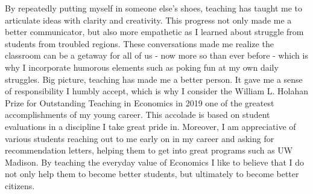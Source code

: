 \documentclass[a4paper,12pt]{article}
\begin{document}
By repeatedly putting myself in someone else’s shoes, teaching has taught me to articulate ideas with clarity and creativity. This progress not only made me a better communicator, but also more empathetic as I learned about struggle from students from troubled regions. These conversations made me realize the classroom can be a getaway for all of us - now more so than ever before - which is why I incorporate humorous elements such as poking fun at my own daily struggles. Big picture, teaching has made me a better person. It gave me a sense of responsibility I humbly accept, which is why I consider the William L. Holahan Prize for Outstanding Teaching in Economics in 2019 one of the greatest accomplishments of my young career. This accolade is based on student evaluations in a discipline I take great pride in. Moreover, I am appreciative of various students reaching out to me early on in my career and asking for recommendation letters, helping them to get into great programs such as UW Madison. By teaching the everyday value of Economics I like to believe that I do not only help them to become better students, but ultimately to become better citizens. 
\end{document}

